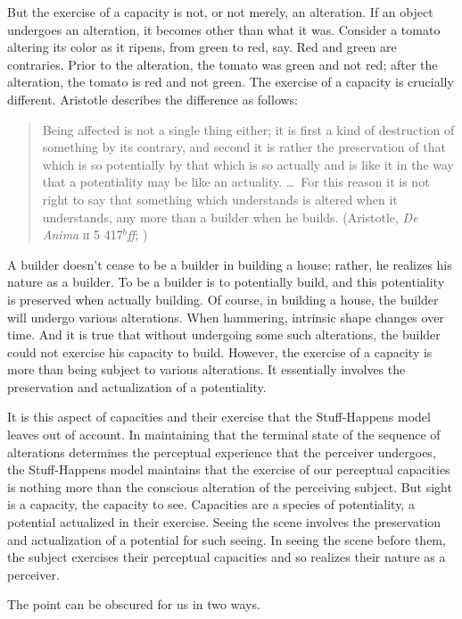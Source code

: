 \documentclass[12pt]{article}
\begin{document}
But the exercise of a capacity is not, or not merely, an alteration. If an object undergoes an alteration, it becomes other than what it was. Consider a tomato altering its color as it ripens, from green to red, say. Red and green are contraries. Prior to the alteration, the tomato was green and not red; after the alteration, the tomato is red and not green. The exercise of a capacity is crucially different. Aristotle describes the difference as follows:
\begin{quote}
    Being affected is not a single thing either; it is first a kind of destruction of something by its contrary, and second it is rather the preservation of that which is so potentially by that which is so actually and is like it in the way that a potentiality may be like an actuality. \ldots\ For this reason it is not right to say that something which understands is altered when it understands, any more than a builder when he builds. (Aristotle, \emph{De Anima} \textsc{ii} 5 417\( ^{b} \)\emph{ff}; \citealt[23--24]{Hamlyn:2002ys})
\end{quote}
A builder doesn't cease to be a builder in building a house; rather, he realizes his nature as a builder. To be a builder is to potentially build, and this potentiality is preserved when actually building. Of course, in building a house, the builder will undergo various alterations. When hammering, intrinsic shape changes over time. And it is true that without undergoing some such alterations, the builder could not exercise his capacity to build. However, the exercise of a capacity is more than being subject to various alterations. It essentially involves the preservation and actualization of a potentiality.

It is this aspect of capacities and their exercise that the Stuff-Happens model leaves out of account. In maintaining that the terminal state of the sequence of alterations determines the perceptual experience that the perceiver undergoes, the Stuff-Happens model maintains that the exercise of our perceptual capacities is nothing more than the conscious alteration of the perceiving subject. But sight is a capacity, the capacity to see. Capacities are a species of potentiality, a potential actualized in their exercise. Seeing the scene involves the preservation and actualization of a potential for such seeing. In seeing the scene before them, the subject exercises their perceptual capacities and so realizes their nature as a perceiver.

The point can be obscured for us in two ways.
\end{document}
